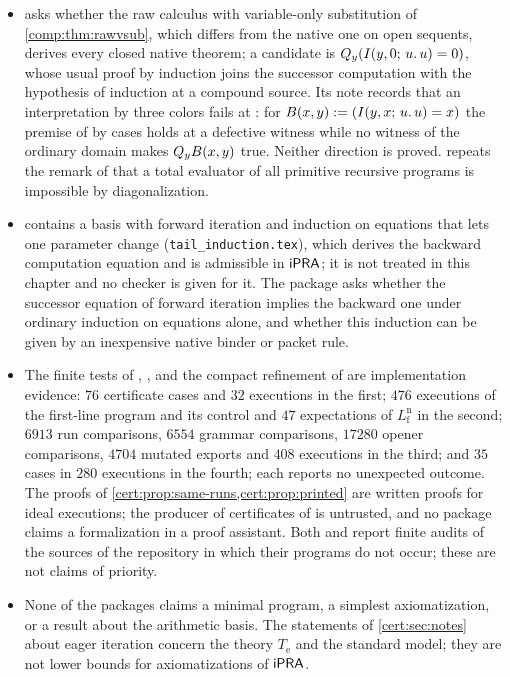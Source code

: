 \begin{itemize}
are written proofs for ideal executions; the translators of the packages are untrusted producers of
certificates, and no package claims a formalization in a proof assistant.
\item {} asks whether the raw calculus with variable-only substitution of
\cref{comp:thm:rawvsub}, which differs from the native one on open sequents, derives every closed
native theorem; a candidate is $Q_{y}(I(y,0;\,u.\,u)=0)$, whose usual proof by induction joins the
successor computation with the hypothesis of induction at a compound source. Its note records that
an interpretation by three colors fails at : for $B(x,y)\mathrel{:=}(I(y,x;\,u.\,u)=x)$ the
premise of  by cases holds at a defective witness while no witness of the ordinary
domain makes $Q_{y}B(x,y)$ true. Neither direction is proved.  repeats the
remark of  that a total evaluator of all primitive recursive programs is
impossible by diagonalization.
\item {} contains a basis with forward iteration and induction on equations
that lets one parameter change (\texttt{tail\_induction.tex}), which derives the backward
computation equation and is admissible in $\mathsf{iPRA}$; it is not treated in this chapter and no checker
is given for it. The package asks whether the successor equation of forward iteration implies the
backward one under ordinary induction on equations alone, and whether this induction can be given
by an inexpensive native binder or packet rule.
\item The finite tests of , ,  and the
compact refinement of  are implementation evidence: $76$ certificate cases and $32$
executions in the first; $476$ executions of the first-line program and its control and $47$
expectations of $L^{\mathrm n}_{\mathrm f}$ in the second; $6913$ run comparisons, $6554$ grammar
comparisons, $17280$ opener comparisons, $4704$ mutated exports and $408$ executions in the third; and
$35$ cases in $280$ executions in the fourth; each reports no unexpected outcome. The proofs of
\cref{cert:prop:same-runs,cert:prop:printed} are written proofs for ideal executions; the producer of
certificates of  is untrusted, and no package claims a formalization in a proof
assistant. Both  and  report finite audits of the sources
of the repository in which their programs do not occur; these are not claims of priority.
\item None of the packages claims a minimal program, a simplest
axiomatization, or a result about the arithmetic basis. The statements of
\cref{cert:sec:notes} about eager iteration concern the theory
$T_{\mathrm e}$ and the standard model; they are not lower bounds for
axiomatizations of $\mathsf{iPRA}$.
\end{itemize}
